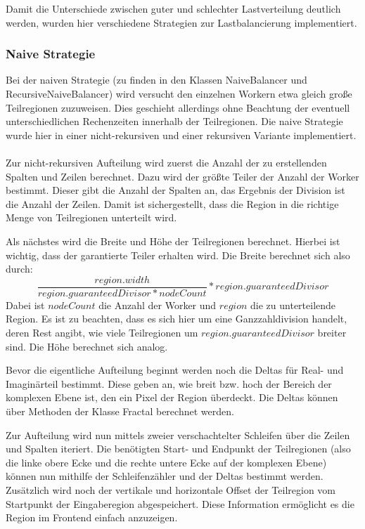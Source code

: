 Damit die Unterschiede zwischen guter und schlechter Lastverteilung deutlich werden, wurden hier verschiedene Strategien zur Lastbalancierung implementiert.

\subsubsection{Naive Strategie}

Bei der naiven Strategie (zu finden in den Klassen NaiveBalancer und RecursiveNaiveBalancer) wird versucht den einzelnen Workern etwa gleich große Teilregionen zuzuweisen.
Dies geschieht allerdings ohne Beachtung der eventuell unterschiedlichen Rechenzeiten innerhalb der Teilregionen.
Die naive Strategie wurde hier in einer nicht-rekursiven  und einer rekursiven Variante implementiert.

\paragraph*{} \label{lastbalancierung_naiv}
Zur nicht-rekursiven Aufteilung wird zuerst die Anzahl der zu erstellenden Spalten und Zeilen berechnet.
Dazu wird der größte Teiler der Anzahl der Worker bestimmt. Dieser gibt die Anzahl der Spalten an, das Ergebnis der Division ist die Anzahl der Zeilen.
Damit ist sichergestellt, dass die Region in die richtige Menge von Teilregionen unterteilt wird.

Als nächstes wird die Breite und Höhe der Teilregionen berechnet. Hierbei ist wichtig, dass der garantierte Teiler erhalten wird.
Die Breite berechnet sich also durch:
\begin{equation*}
	\frac{region.width}{region.guaranteedDivisor * nodeCount} * region.guaranteedDivisor
\end{equation*}
Dabei ist $nodeCount$ die Anzahl der Worker und $region$ die zu unterteilende Region.
Es ist zu beachten, dass es sich hier um eine Ganzzahldivision handelt, deren Rest angibt, wie viele Teilregionen um $region.guaranteedDivisor$ breiter sind.
Die Höhe berechnet sich analog.

Bevor die eigentliche Aufteilung beginnt werden noch die Deltas für Real- und Imaginärteil bestimmt.
Diese geben an, wie breit bzw. hoch der Bereich der komplexen Ebene ist, den ein Pixel der Region überdeckt.
Die Deltas können über Methoden der Klasse Fractal berechnet werden.

Zur Aufteilung wird nun mittels zweier verschachtelter Schleifen über die Zeilen und Spalten iteriert.
Die benötigten Start- und Endpunkt der Teilregionen (also die linke obere Ecke und die rechte untere Ecke auf der komplexen Ebene) können nun mithilfe der Schleifenzähler und der Deltas bestimmt werden.
Zusätzlich wird noch der vertikale und horizontale Offset der Teilregion vom Startpunkt der Eingaberegion abgespeichert. Diese Information ermöglicht es die Region im Frontend einfach anzuzeigen.

